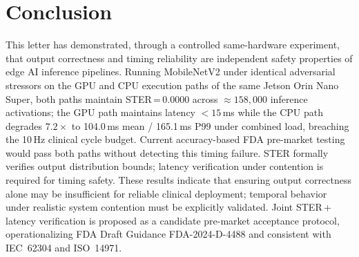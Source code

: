 \documentclass[journal,10pt,twocolumn]{IEEEtran}
\begin{document}
\section{Conclusion}

This letter has demonstrated, through a controlled same-hardware
experiment, that output correctness and timing reliability are
independent safety properties of edge AI inference pipelines.
Running MobileNetV2 under identical adversarial stressors on the GPU
and CPU execution paths of the same Jetson Orin Nano Super, both
paths maintain STER\,=\,0.0000 across ${\approx}158{,}000$ inference
activations; the GPU path maintains latency ${<}15$\,ms while the CPU
path degrades $7.2{\times}$ to 104.0\,ms mean / 165.1\,ms P99 under
combined load, breaching the 10\,Hz clinical cycle budget.
Current accuracy-based FDA pre-market testing would pass both paths
without detecting this timing failure.
STER formally verifies output distribution bounds; latency verification
under contention is required for timing safety.
These results indicate that ensuring output correctness alone may be
insufficient for reliable clinical deployment; temporal behavior under
realistic system contention must be explicitly validated.
Joint STER\,+\,latency verification is proposed as a candidate
pre-market acceptance protocol, operationalizing FDA Draft Guidance
FDA-2024-D-4488 and consistent with IEC~62304 and ISO~14971.


\end{document}
